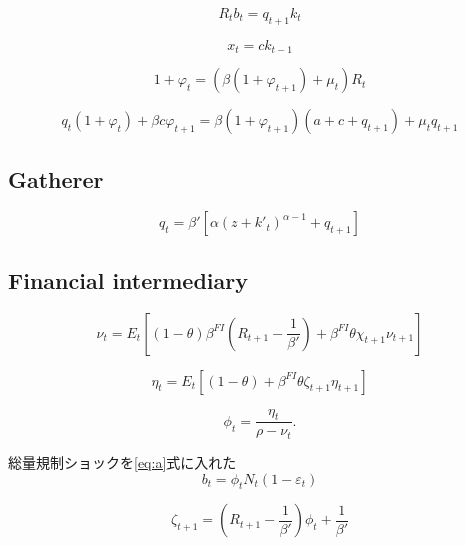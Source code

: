 \documentclass[dvipdfmx]{jlreq}
\begin{document}
\begin{equation}
R_tb_t=q_{t+1}k_t
\end{equation}

\begin{equation}
x_t=ck_{t-1}
\end{equation}

\begin{equation}
1+\varphi_t
=
(\beta(1+\varphi_{t+1})+\mu_t)R_t
\end{equation}

\begin{equation}
q_t(1+\varphi_t)+\beta c\varphi_{t+1}
=
\beta(1+\varphi_{t+1})(a+c+q_{t+1})
+\mu_tq_{t+1}
\end{equation}

\subsection{Gatherer}

\begin{equation}
q_t
=
\beta'
\left[
\alpha(z+k'_t)^{\alpha-1}
+
q_{t+1}
\right]
\end{equation}

\subsection{Financial intermediary}

\begin{equation}
\nu_t
=
E_t
\left[
(1-\theta)\beta^{FI}
\left(
R_{t+1}-\frac1{\beta'}
\right)
+\beta^{FI}\theta\chi_{t+1}\nu_{t+1}
\right]
\end{equation}

\begin{equation}
\eta_t
=
E_t
\left[
(1-\theta)
+
\beta^{FI}\theta
\zeta_{t+1}\eta_{t+1}
\right]
\end{equation}

\begin{equation}
\phi_t
=
\frac{\eta_t}{\rho-\nu_t}.
\end{equation}

総量規制ショックを\eqref{eq:a}式に入れた
\begin{equation} \label{eq:a}
b_t
=
\phi_tN_t (1-\varepsilon_t)
\end{equation}

\begin{equation}
\zeta_{t+1}
=
(R_{t+1}-\frac{1}{\beta'})
\phi_t
+\frac{1}{\beta'}
\end{equation}
\end{document}
